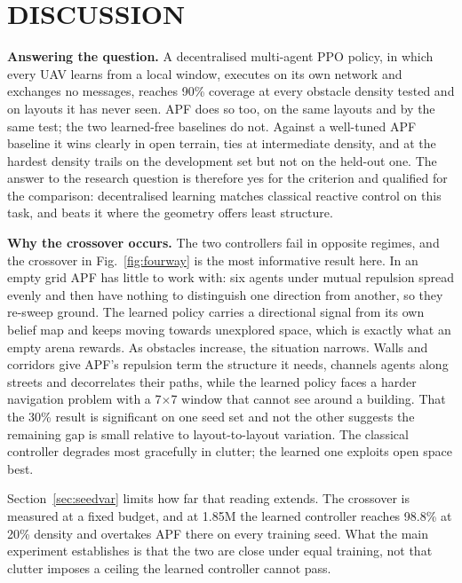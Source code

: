 \documentclass[a4paper, 10pt, conference]{ieeeconf}
\begin{document}
\section{DISCUSSION}\label{sec:discussion}

\textbf{Answering the question.} A decentralised multi-agent PPO
policy, in which every UAV learns from a local window, executes on its
own network and exchanges no messages, reaches 90\% coverage at every
obstacle density tested and on layouts it has never seen. APF does so too, on the same layouts and by
the same test; the two learned-free baselines do not. Against a
well-tuned APF baseline it wins clearly in
open terrain, ties at intermediate density, and at the hardest density
trails on the development set but not on the held-out one. The answer to the research question is therefore yes
for the criterion and qualified for the comparison: decentralised
learning matches classical reactive control on this task, and beats it
where the geometry offers least structure.

\textbf{Why the crossover occurs.} The two controllers fail in
opposite regimes, and the crossover in Fig.~\ref{fig:fourway} is the
most informative result here. In an empty grid APF has little to work
with: six agents under mutual repulsion spread evenly and then have
nothing to distinguish one direction from another, so they re-sweep
ground. The learned policy carries a directional signal from its own
belief map and keeps moving towards unexplored space, which is exactly
what an empty arena rewards. As obstacles increase, the situation
narrows. Walls and corridors give APF's repulsion term the structure
it needs, channels agents along streets and decorrelates their
paths, while the learned policy faces a harder navigation problem with
a 7$\times$7 window that cannot see around a building. That the 30\%
result is significant on one seed set and not the other suggests the
remaining gap is small relative to layout-to-layout variation. The classical
controller degrades most gracefully in clutter; the learned one
exploits open space best.

Section~\ref{sec:seedvar} limits how far that reading extends. The
crossover is measured at a fixed budget, and at 1.85M the learned
controller reaches 98.8\% at 20\% density and overtakes APF there on
every training seed. What the main experiment establishes is that the
two are close under equal training, not that clutter imposes a ceiling
the learned controller cannot pass.
\end{document}
